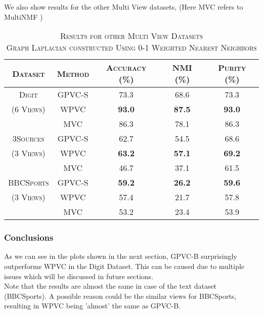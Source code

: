 \documentclass[a4paper]{article}
\begin{document}
	\noindent
	We also show results for the other Multi View datasets, (Here MVC refers to MultiNMF \cite{nmfsdm})	
	\begin{table}[h!]
	  \begin{center}
	    \begin{tabular}{c|c|c|c|c}
	      \toprule
		  \textsc{Dataset} & \textsc{Method} & \textsc{Accuracy (\%) } & \textsc{NMI (\%) } 
	      & \textsc{Purity (\%)} 	\\
            
		  \midrule
			\textsc{Digit} & \textsc{GPVC-S} & 73.3 & 68.6 & 73.3\\  
			\footnotesize\textsc{(6 Views)} & \textsc{WPVC} & \textbf{93.0} & \textbf{87.5} & \textbf{93.0}\\
			& \textsc{MVC} & 86.3 & 78.1 & 86.3\\  
		  \midrule
	    	\textsc{3Sources} & \textsc{GPVC-S} & 62.7 & 54.5 & 68.6\\  
			\footnotesize\textsc{(3 Views)} & \textsc{WPVC} & \textbf{63.2} & \textbf{57.1} & \textbf{69.2}\\
			& \textsc{MVC} & 46.7 & 37.1 & 61.5\\  
		  \midrule
	    	\textsc{BBCSports} & \textsc{GPVC-S} & \textbf{59.2} & \textbf{26.2} & \textbf{59.6}\\  
			\footnotesize\textsc{(3 Views)} & \textsc{WPVC} & {57.4} & {21.7} & {57.8}\\
			& \textsc{MVC} & 53.2 & 23.4 & 53.9\\  
		  \midrule

	    \end{tabular}
	    \caption*{\textsc{Results for other Multi View Datasets\\Graph Laplacian constructed Using 0-1 Weighted Nearest Neighbors}}
	  \end{center}
	\end{table}		


	\subsubsection{Conclusions}
	
	As we can see in the plots shown in the next section, GPVC-B surprisingly outperforms WPVC in the Digit Dataset. This can be caused due to multiple issues which will be discussed in future sections.\\
	Note that the results are almost the same in case of the text dataset (BBCSports). A possible reason could be the similar views for BBCSports, resulting in WPVC being 'almost' the same as GPVC-B.
\end{document}
